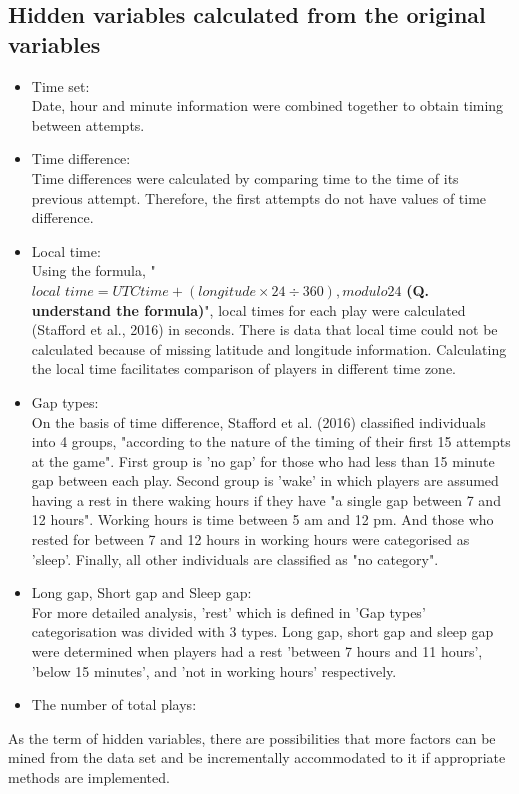 \documentclass[12pt,a4paper]{report}
\begin{document}
\subsection{Hidden variables calculated from the original variables}
	\begin{itemize}
		\item Time set: \\
		Date, hour and minute information were combined together to obtain timing between attempts.
	    	\item Time difference: \\
		Time differences were calculated by comparing time to the time of its previous attempt. Therefore, the first attempts do not have values of time difference.
    		\item Local time: \\
		Using the formula, "$\textit{local time} = \textit{UTCtime} + (\textit{longitude} × 24\div360),\textit{modulo}24$  \textbf{(Q. understand the formula)}", local times for each play were calculated (Stafford et al., 2016) in seconds. There is data that local time could not be calculated because of missing latitude and longitude information. Calculating the local time facilitates comparison of players in different time zone.
    		\item Gap types: \\
		On the basis of time difference, Stafford et al. (2016) classified individuals into 4 groups, "according to the nature of the timing of their first 15 attempts at the game". First group is 'no gap' for those who had less than 15 minute gap between each play. Second group is 'wake' in which players are assumed having a rest in there waking hours if they have "a single gap between 7 and 12 hours". Working hours is time between 5 am and 12 pm. And those who rested for between 7 and 12 hours in working hours were categorised as 'sleep'. Finally, all other individuals are classified as "no category".
	    	\item Long gap, Short gap and Sleep gap: \\
		For more detailed analysis, 'rest' which is defined in 'Gap types' categorisation was divided with 3 types. Long gap, short gap and sleep gap were determined when players had a rest 'between 7 hours and 11 hours', 'below 15 minutes', and 'not in working hours' respectively.
		\item The number of total plays: 
	\end{itemize}

As the term of hidden variables, there are possibilities that more factors can be mined from the data set and be incrementally accommodated to it if appropriate methods are implemented.
\end{document}
